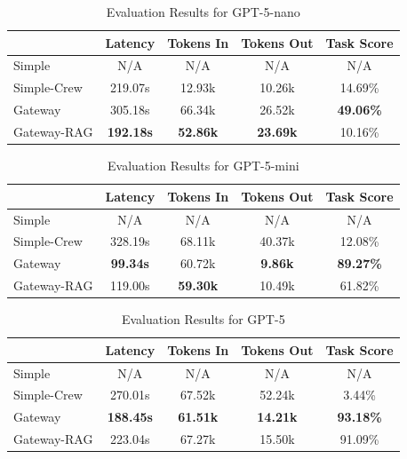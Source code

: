 \begin{table}[ht]
\centering
\caption{Evaluation Results for GPT-5-nano}
\renewcommand{\arraystretch}{1.2}
\setlength{\tabcolsep}{7pt}

\begin{tabular}{lcccc}
\toprule    & Latency          & Tokens In       & Tokens Out      & Task Score \\
\midrule
Simple      & N/A              & N/A             & N/A             & N/A \\
Simple-Crew & 219.07s          & 12.93k          & 10.26k          & 14.69\% \\
Gateway     & 305.18s          & 66.34k          & 26.52k          & \textbf{49.06\%} \\
Gateway-RAG & \textbf{192.18s} & \textbf{52.86k} & \textbf{23.69k} & 10.16\% \\
\bottomrule
\end{tabular}
\label{fig:gpt-5-nano}
\end{table}

\begin{table}[ht]
\centering
\caption{Evaluation Results for GPT-5-mini}
\renewcommand{\arraystretch}{1.2}
\setlength{\tabcolsep}{7pt}

\begin{tabular}{lcccc}
\toprule    & Latency          & Tokens In       & Tokens Out      & Task Score \\
\midrule
Simple      & N/A              & N/A             & N/A             & N/A \\
Simple-Crew & 328.19s          & 68.11k          & 40.37k          & 12.08\% \\
Gateway     & \textbf{99.34s}  & 60.72k          & \textbf{9.86k}  & \textbf{89.27\%} \\
Gateway-RAG & 119.00s          & \textbf{59.30k} & 10.49k          & 61.82\% \\
\bottomrule
\end{tabular}
\label{fig:gpt-5-mini}
\end{table}

\begin{table}[ht]
\centering
\caption{Evaluation Results for GPT-5}
\renewcommand{\arraystretch}{1.2}
\setlength{\tabcolsep}{7pt}

\begin{tabular}{lcccc}
\toprule    & Latency          & Tokens In       & Tokens Out      & Task Score \\
\midrule
Simple      & N/A              & N/A             & N/A             & N/A \\
Simple-Crew & 270.01s          & 67.52k          & 52.24k          & 3.44\% \\
Gateway     & \textbf{188.45s} & \textbf{61.51k} & \textbf{14.21k} & \textbf{93.18\%} \\
Gateway-RAG & 223.04s          & 67.27k          & 15.50k          & 91.09\% \\
\bottomrule
\end{tabular}
\label{fig:gpt-5-appendix}
\end{table}